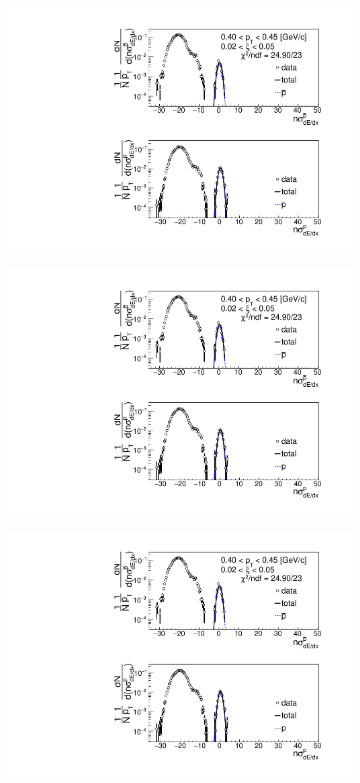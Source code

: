 \begin{figure}[h!]
	\centering
	\begin{subfigure}{.32\textwidth}
		\includegraphics[width=\linewidth, page=1]{chapters/chrgSTAR/img/dEdx/fit2019_thirdStep_2_0.pdf}
	\end{subfigure}
	\begin{subfigure}{.32\textwidth}
		\includegraphics[width=\linewidth, page=2]{chapters/chrgSTAR/img/dEdx/fit2019_thirdStep_2_0.pdf}
	\end{subfigure}
	\begin{subfigure}{.32\textwidth}
		\includegraphics[width=\linewidth, page=3]{chapters/chrgSTAR/img/dEdx/fit2019_thirdStep_2_0.pdf}

\end{subfigure}
\end{figure}

